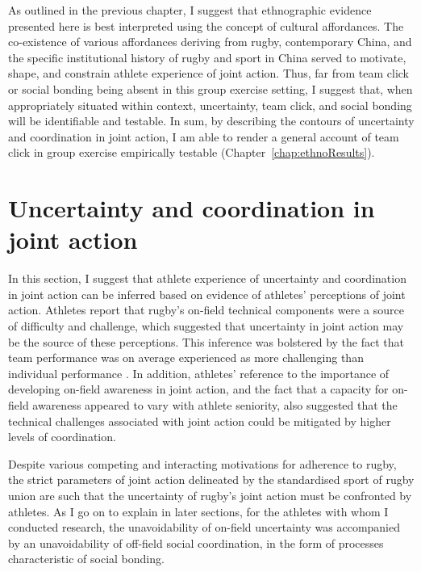 \begin{CJK}{UTF8}{gbsn}
As outlined in the previous chapter, I suggest that ethnographic evidence presented here is best interpreted using the concept of cultural affordances.  The co-existence of various affordances deriving from rugby, contemporary China, and the specific institutional history of rugby and sport in China served to motivate, shape, and constrain athlete experience of joint action.  Thus, far from team click or social bonding being absent in this group exercise setting, I suggest that, when appropriately situated within context, uncertainty, team click, and social bonding will be identifiable and testable.  In sum, by describing the contours of uncertainty and coordination in joint action, I am able to render a general account of team click in group exercise empirically testable (Chapter~\ref{chap:ethnoResults}).




\section{Uncertainty and coordination in joint action\label{sect:uncertaintyJA}}
In this section, I suggest that athlete experience of uncertainty and coordination in joint action can be inferred based on evidence of athletes' perceptions of joint action.  Athletes report that rugby's on-field technical components were a source of difficulty and challenge, which suggested that uncertainty in joint action may be the source of these perceptions.  This inference was bolstered by the fact that team performance was on average experienced as more challenging than individual performance \citep[under the assumption that team performance entails higher levels of uncertainty than individual performance, see:][]{Fusaroli2014}.  In addition, athletes' reference to the importance of developing on-field awareness in joint action, and the fact that a capacity for on-field awareness appeared to vary with athlete seniority, also suggested that the technical challenges associated with joint action could be mitigated by higher levels of coordination.

Despite various competing and interacting motivations for adherence to rugby, the strict parameters of joint action delineated by the standardised sport of rugby union are such that the uncertainty of rugby's joint action must be confronted by athletes.  As I go on to explain in later sections, for the athletes with whom I conducted research, the unavoidability of on-field uncertainty was accompanied by an unavoidability of off-field social coordination, in the form of processes characteristic of social bonding.


\end{CJK}

